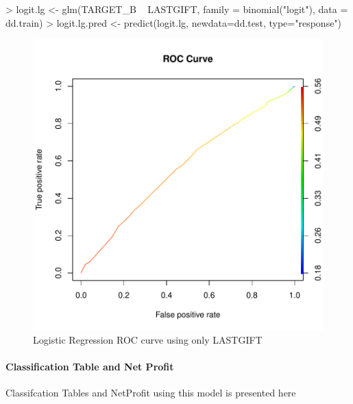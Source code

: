 \documentclass{article}
\begin{document}
\begin{Schunk}
\begin{Sinput}
> logit.lg <- glm(TARGET_B ~ LASTGIFT, family = binomial("logit"), data = dd.train)
> logit.lg.pred <- predict(logit.lg, newdata=dd.test, type="response")
\end{Sinput}
\end{Schunk}

\begin{figure}
\begin{center}
\begin{Schunk}
\end{Schunk}
\includegraphics{DirectMailPrediction-009}
\end{center}
\caption{Logistic Regression ROC curve using only LASTGIFT}
\label{lr-roc-b}
\end{figure}

\paragraph{Classification Table and Net Profit}
Classifcation Tables and NetProfit using this model is presented here
\end{document}
